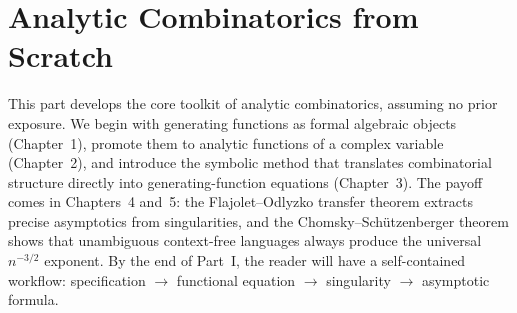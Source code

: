 \part{Analytic Combinatorics from Scratch}

This part develops the core toolkit of analytic combinatorics, assuming no prior exposure. We begin with generating functions as formal algebraic objects (Chapter~1), promote them to analytic functions of a complex variable (Chapter~2), and introduce the symbolic method that translates combinatorial structure directly into generating-function equations (Chapter~3). The payoff comes in Chapters~4 and~5: the Flajolet--Odlyzko transfer theorem extracts precise asymptotics from singularities, and the Chomsky--Sch\"utzenberger theorem shows that unambiguous context-free languages always produce the universal $n^{-3/2}$ exponent. By the end of Part~I, the reader will have a self-contained workflow: specification $\to$ functional equation $\to$ singularity $\to$ asymptotic formula.






